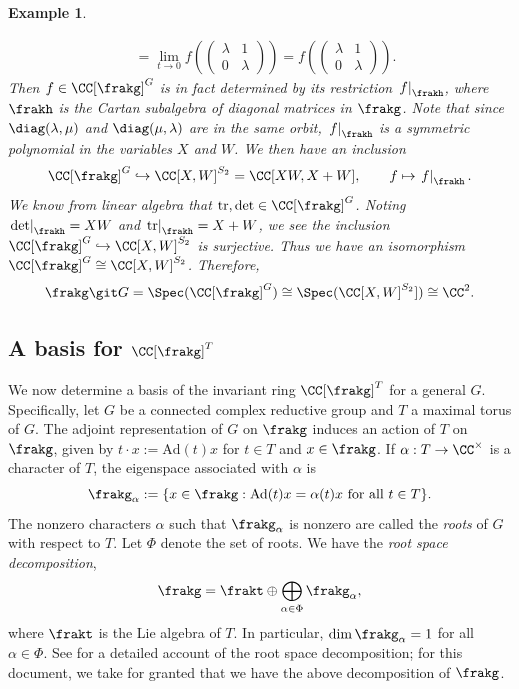 \documentclass[12pt]{amsart}
\theoremstyle{plain}
\newtheorem{example}[theorem]{Example}
\begin{document}
\begin{example}
\begin{enumerate}
\begin{align*}
&= \lim_{t \to 0} f\left( \begin{pmatrix} \lambda & 1 \\ 0 & \lambda \end{pmatrix} \right) 
= f\left( \begin{pmatrix} \lambda & 1 \\ 0 & \lambda \end{pmatrix} \right).
\end{align*}
Then $f \in \CC[\frakg]^G$ is in fact determined by its restriction $\left. f \right|_{\frakh}$, where $\frakh$ is the Cartan subalgebra of diagonal matrices in $\frakg$.
Note that since $\diag(\lambda, \mu)$ and $\diag(\mu, \lambda)$ are in the same orbit, $\left. f \right|_\frakh$ is a symmetric polynomial in the variables $X$ and $W$.
We then have an inclusion
$$\CC[\frakg]^G \hookrightarrow \CC[X, W]^{S_2} = \CC[XW, X+W], \qquad f \mapsto \left. f \right|_\frakh.$$
We know from linear algebra that $\mathrm{tr}, \mathrm{det} \in \CC[\frakg]^G$.
Noting $\left. \mathrm{det} \right|_\frakh = XW$ and $\left. \mathrm{tr} \right|_\frakh = X+W$, we see the inclusion $\CC[\frakg]^G \hookrightarrow \CC[X, W]^{S_2}$ is surjective.
Thus we have an isomorphism $\CC[\frakg]^G \cong \CC[X, W]^{S_2}$.
Therefore,
$$\frakg \git G = \Spec(\CC[\frakg]^G) \cong \Spec(\CC[X, W]^{S_2}]) \cong \CC^2.$$
\end{enumerate}
\end{example}

\subsection{A basis for $\CC[\frakg]^T$}
We now determine a basis of the invariant ring $\CC[\frakg]^T$ for a general $G$.
Specifically, let $G$ be a connected complex reductive group and $T$ a maximal torus of $G$.
The adjoint representation of $G$ on $\frakg$ induces an action of $T$ on $\frakg$, given by $t \cdot x := \mathrm{Ad}(t)x$ for $t \in T$ and $x \in \frakg$.
If $\alpha : T \to \CC^\times$ is a character of $T$, the eigenspace associated with $\alpha$ is
$$\frakg_\alpha := \{x \in \frakg : \mathrm{Ad}(t) x = \alpha(t) x \text{ for all } t \in T\}.$$
The nonzero characters $\alpha$ such that $\frakg_\alpha$ is nonzero are called the \emph{roots} of $G$ with respect to $T$.
Let $\Phi$ denote the set of roots.
We have the \emph{root space decomposition},
$$\frakg = \frakt \oplus \bigoplus_{\alpha \in \Phi} \frakg_\alpha,$$
where $\frakt$ is the Lie algebra of $T$.
In particular, $\dim \frakg_\alpha = 1$ for all $\alpha \in \Phi$.
See \cite[II, \S 5]{Milne13} for a detailed account of the root space decomposition;
for this document, we take for granted that we have the above decomposition of $\frakg$.
\end{document}
